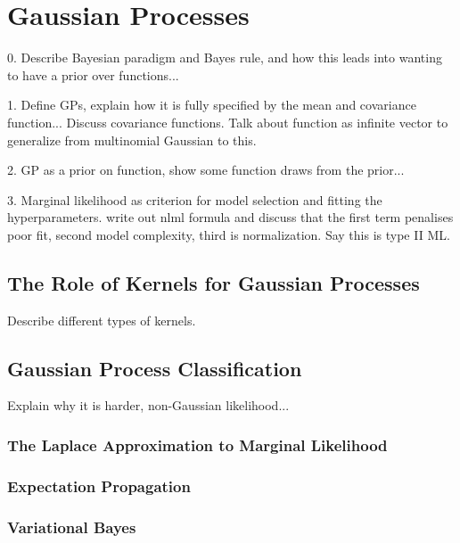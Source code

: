 \documentclass[a4paper,12pt ]{report}
\begin{document}

\chapter{Gaussian Processes}

0. Describe Bayesian paradigm and Bayes rule, and how this leads into wanting to have a prior over functions... 

1. Define GPs, explain how it is fully specified by the mean and covariance function... Discuss covariance functions. Talk about function as infinite vector to generalize from multinomial Gaussian to this. 

2. GP as a prior on function, show some function draws from the prior...

3. Marginal likelihood as criterion for model selection and fitting the hyperparameters. write out nlml formula and discuss that the first term penalises poor fit, second model complexity, third is normalization. Say this is type II ML.



\section{The Role of Kernels for Gaussian Processes}

Describe different types of kernels. 

\section{Gaussian Process Classification}

Explain why it is harder, non-Gaussian likelihood...

\subsection{The Laplace Approximation to Marginal Likelihood}

\subsection{Expectation Propagation}

\subsection{Variational Bayes}
\end{document}
